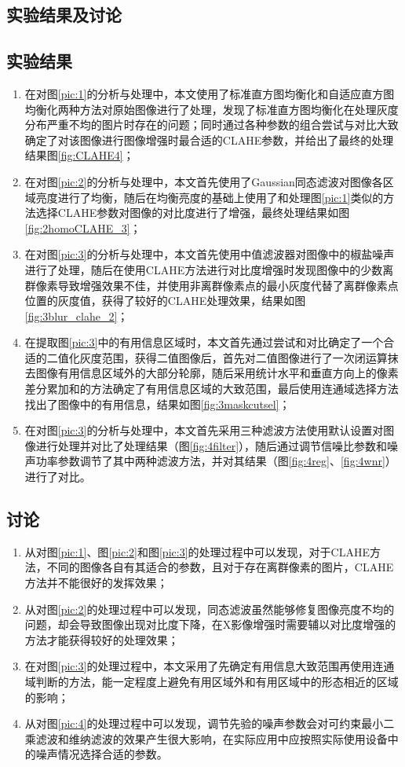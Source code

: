 \documentclass[a4paper]{ctexart}
\begin{document}
\begin{spacing}{1.35}
	\section{实验结果及讨论}
	\subsection{实验结果}
	\begin{enumerate}
		\item 在对图\ref{pic:1}的分析与处理中，本文使用了标准直方图均衡化和自适应直方图均衡化两种方法对原始图像进行了处理，发现了标准直方图均衡化在处理灰度分布严重不均的图片时存在的问题；同时通过各种参数的组合尝试与对比大致确定了对该图像进行图像增强时最合适的CLAHE参数，并给出了最终的处理结果图\ref{fig:CLAHE4}；
		\item 在对图\ref{pic:2}的分析与处理中，本文首先使用了Gaussian同态滤波对图像各区域亮度进行了均衡，随后在均衡亮度的基础上使用了和处理图\ref{pic:1}类似的方法选择CLAHE参数对图像的对比度进行了增强，最终处理结果如图\ref{fig:2homoCLAHE_3}；
		\item 在对图\ref{pic:3}的分析与处理中，本文首先使用中值滤波器对图像中的椒盐噪声进行了处理，随后在使用CLAHE方法进行对比度增强时发现图像中的少数离群像素导致增强效果不佳，并使用非离群像素点的最小灰度代替了离群像素点位置的灰度值，获得了较好的CLAHE处理效果，结果如图\ref{fig:3blur_clahe_2}；
		\item 在提取图\ref{pic:3}中的有用信息区域时，本文首先通过尝试和对比确定了一个合适的二值化灰度范围，获得二值图像后，首先对二值图像进行了一次闭运算抹去图像有用信息区域外的大部分轮廓，随后采用统计水平和垂直方向上的像素差分累加和的方法确定了有用信息区域的大致范围，最后使用连通域选择方法找出了图像中的有用信息，结果如图\ref{fig:3maskcutsel}；
		\item 在对图\ref{pic:3}的分析与处理中，本文首先采用三种滤波方法使用默认设置对图像进行处理并对比了处理结果（图\ref{fig:4filter}），随后通过调节信噪比参数和噪声功率参数调节了其中两种滤波方法，并对其结果（图\ref{fig:4reg}、\ref{fig:4wnr}）进行了对比。
	\end{enumerate}

	\subsection{讨论}
	\begin{enumerate}
		\item 从对图\ref{pic:1}、图\ref{pic:2}和图\ref{pic:3}的处理过程中可以发现，对于CLAHE方法，不同的图像各自有其适合的参数，且对于存在离群像素的图片，CLAHE方法并不能很好的发挥效果；
		\item 从对图\ref{pic:2}的处理过程中可以发现，同态滤波虽然能够修复图像亮度不均的问题，却会导致图像出现对比度下降，在X影像增强时需要辅以对比度增强的方法才能获得较好的处理效果；
		\item 在对图\ref{pic:3}的处理过程中，本文采用了先确定有用信息大致范围再使用连通域判断的方法，能一定程度上避免有用区域外和有用区域中的形态相近的区域的影响；
		\item 从对图\ref{pic:4}的处理过程中可以发现，调节先验的噪声参数会对可约束最小二乘滤波和维纳滤波的效果产生很大影响，在实际应用中应按照实际使用设备中的噪声情况选择合适的参数。
	\end{enumerate}

	
	
\end{spacing}
\end{document}
